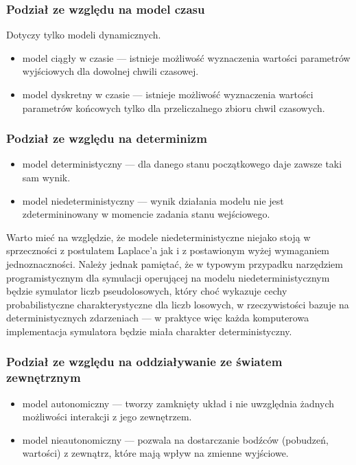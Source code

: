 \subsubsection{Podział ze względu na model czasu}
\par{
Dotyczy tylko modeli dynamicznych.
\begin{itemize}
\item model ciągły w czasie --- istnieje możliwość wyznaczenia wartości parametrów wyjściowych dla dowolnej chwili czasowej.
\item model dyskretny w czasie --- istnieje możliwość wyznaczenia wartości parametrów końcowych tylko dla przeliczalnego zbioru chwil czasowych.
\end{itemize}
}

\subsubsection{Podział ze względu na determinizm}
\par{
\begin{itemize}
\item model deterministyczny --- dla danego stanu początkowego daje zawsze taki sam wynik.
\item model niedeterministyczny --- wynik działania modelu nie jest zdetermininowany w momencie zadania stanu wejściowego.
\end{itemize}
}
\par{
Warto mieć na względzie, że modele niedeterministyczne niejako stoją w sprzeczności z postulatem Laplace'a jak i z postawionym wyżej wymaganiem jednoznaczności. Należy jednak pamiętać, że w typowym przypadku narzędziem programistycznym dla symulacji operującej na modelu niedeterministycznym będzie symulator liczb pseudolosowych, który choć wykazuje cechy probabilistyczne charakterystyczne dla liczb losowych, w rzeczywistości bazuje na deterministycznych zdarzeniach --- w praktyce więc każda komputerowa implementacja symulatora będzie miała charakter deterministyczny.
}

\subsubsection{Podział ze względu na oddziaływanie ze światem zewnętrznym}
\par{
\begin{itemize}
\item model autonomiczny --- tworzy zamknięty układ i nie uwzględnia żadnych możliwości interakcji z jego zewnętrzem.
\item model nieautonomiczny --- pozwala na dostarczanie bodźców (pobudzeń, wartości) z zewnątrz, które mają wpływ na zmienne wyjściowe.
\end{itemize}
}

